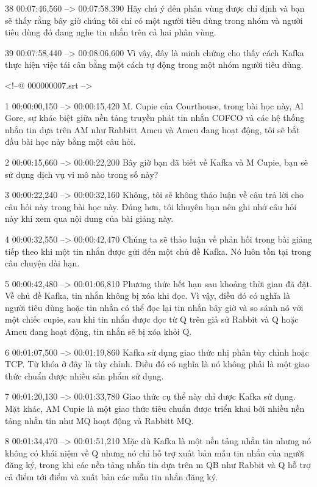 38
00:07:46,560 --> 00:07:58,390
Hãy chú ý đến phân vùng được chỉ định và bạn sẽ thấy rằng bây giờ chúng tôi chỉ có một người tiêu dùng trong nhóm và người tiêu dùng đó đang nghe tin nhắn trên cả hai phân vùng.

39
00:07:58,440 --> 00:08:06,600
Vì vậy, đây là minh chứng cho thấy cách Kafka thực hiện việc tái cân bằng một cách tự động trong một nhóm người tiêu dùng.

<!--@ 000000007.srt -->

1
00:00:00,150 --> 00:00:15,420
M. Cupie của Courthouse, trong bài học này, Al Gore, sự khác biệt giữa nền tảng truyền phát tin nhắn COFCO và các hệ thống nhắn tin dựa trên AM như Rabbitt Amcu và Amcu đang hoạt động, tôi sẽ bắt đầu bài học này bằng một câu hỏi.

2
00:00:15,660 --> 00:00:22,200
Bây giờ bạn đã biết về Kafka và M Cupie, bạn sẽ sử dụng dịch vụ vi mô nào trong số này?

3
00:00:22,240 --> 00:00:32,160
Không, tôi sẽ không thảo luận về câu trả lời cho câu hỏi này trong bài học này.  Đúng hơn, tôi khuyên bạn nên ghi nhớ câu hỏi này khi xem qua nội dung của bài giảng này.

4
00:00:32,550 --> 00:00:42,470
Chúng ta sẽ thảo luận về phản hồi trong bài giảng tiếp theo khi một tin nhắn được gửi đến một chủ đề Kafka.  Nó luôn tồn tại trong câu chuyện dài hạn.

5
00:00:42,480 --> 00:01:06,810
Phương thức hết hạn sau khoảng thời gian đã đặt.  Về chủ đề Kafka, tin nhắn không bị xóa khi đọc.  Vì vậy, điều đó có nghĩa là người tiêu dùng hoặc tin nhắn có thể đọc lại tin nhắn bây giờ và so sánh nó với một chiếc cupie, sau khi tin nhắn được đọc từ Q trên giả sử Rabbit và Q hoặc Amcu đang hoạt động, tin nhắn sẽ bị xóa khỏi Q.

6
00:01:07,500 --> 00:01:19,860
Kafka sử dụng giao thức nhị phân tùy chỉnh hoặc TCP.  Từ khóa ở đây là tùy chỉnh.  Điều đó có nghĩa là nó không phải là một giao thức chuẩn được nhiều sản phẩm sử dụng.

7
00:01:20,130 --> 00:01:33,780
Giao thức cụ thể này chỉ được Kafka sử dụng.  Mặt khác, AM Cupie là một giao thức tiêu chuẩn được triển khai bởi nhiều nền tảng nhắn tin như MQ hoạt động và Rabbitt MQ.

8
00:01:34,470 --> 00:01:51,210
Mặc dù Kafka là một nền tảng nhắn tin nhưng nó không có khái niệm về Q nhưng nó chỉ hỗ trợ xuất bản mẫu tin nhắn của người đăng ký, trong khi các nền tảng nhắn tin dựa trên m QB như Rabbit và Q hỗ trợ cả điểm tới điểm và xuất bản các mẫu tin nhắn đăng ký.

